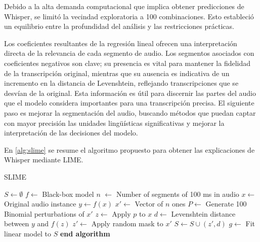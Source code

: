 \documentclass[conference]{IEEEtran}
\begin{document}
Debido a la alta demanda computacional que implica obtener predicciones de Whisper, se limitó la vecindad exploratoria a 100 combinaciones. Esto estableció un equilibrio entre la profundidad del análisis y las restricciones prácticas.

Los coeficientes resultantes de la regresión lineal ofrecen una interpretación directa de la relevancia de cada segmento de audio. Los segmentos asociados con coeficientes negativos son clave; su presencia es vital para mantener la fidelidad de la transcripción original, mientras que su ausencia es indicativa de un incremento en la distancia de Levenshtein, reflejando transcripciones que se desvían de la original. Esta información es útil para discernir las partes del audio que el modelo considera importantes para una transcripción precisa. El siguiente paso es mejorar la segmentación del audio, buscando métodos que puedan captar con mayor precisión las unidades lingüísticas significativas y mejorar la interpretación de las decisiones del modelo.

En \ref{alg:slime} se resume el algoritmo propuesto para obtener las explicaciones de Whisper mediante LIME.

\begin{algorithm}
\caption{SLIME}
\begin{algorithmic}[1]
\State $S \gets \emptyset$
\State $f \gets$ Black-box model
\State $n$ $\gets$ Number of segments of 100 ms in audio
\State $x \gets$ Original audio instance
\State $y \gets f(x)$
\State $x' \gets$ Vector of $n$ ones
\State $P \gets$ Generate 100 Binomial perturbations of $x'$
    \State $z \gets$ Apply $p$ to $x$
    \State $d \gets$  Levenshtein distance between $y$ and $f(z)$
    \State $z' \gets$ Apply random mask to $x'$
    \State $S \gets S \cup (z', d)$
\EndFor
\State $g \gets$ Fit linear model to $S$
\State \textbf{end algorithm}
\end{algorithmic}
\label{alg:slime}
\end{algorithm}
\end{document}
